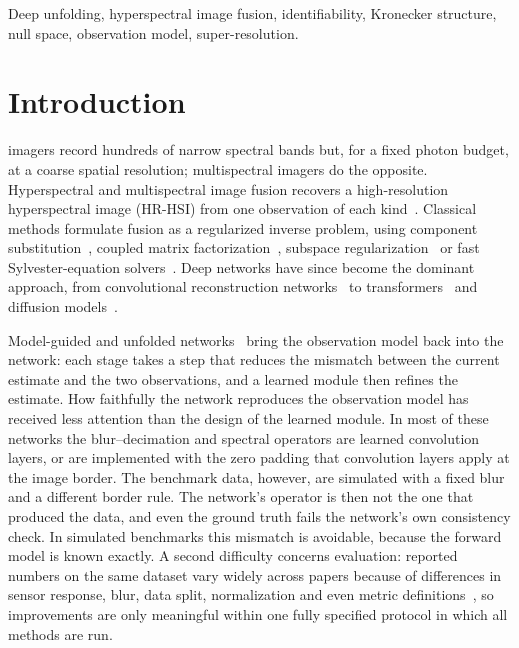 \documentclass[journal]{IEEEtran}
\begin{document}
\begin{IEEEkeywords}
Deep unfolding, hyperspectral image fusion, identifiability, Kronecker structure, null space, observation model, super-resolution.
\end{IEEEkeywords}

\section{Introduction}
 imagers record hundreds of narrow spectral bands but, for a fixed photon budget, at a coarse spatial resolution; multispectral imagers do the opposite. Hyperspectral and multispectral image fusion recovers a high-resolution hyperspectral image (HR-HSI) from one observation of each kind~\cite{yokoya2017review,loncan2015review,vivone2025deep}. Classical methods formulate fusion as a regularized inverse problem, using component substitution~\cite{aiazzi2007gsa}, coupled matrix factorization~\cite{yokoya2012cnmf}, subspace regularization~\cite{simoes2015hysure} or fast Sylvester-equation solvers~\cite{wei2015fuse}. Deep networks have since become the dominant approach, from convolutional reconstruction networks~\cite{zhang2021ssrnet,ran2023guidednet} to transformers~\cite{deng2023psrt,fang2024mimosst,he2024lgct,fu2025ssdt} and diffusion models~\cite{chen2026twostage,cao2024ddif,xu2026cdps,zhu2025argsdiff}.

Model-guided and unfolded networks~\cite{xie2022mhfnet,huang2022dhif,dong2021mogdcn,fang2024dunet,tian2024hmpnet,sun2025iatun} bring the observation model back into the network: each stage takes a step that reduces the mismatch between the current estimate and the two observations, and a learned module then refines the estimate. How faithfully the network reproduces the observation model has received less attention than the design of the learned module. In most of these networks the blur--decimation and spectral operators are learned convolution layers, or are implemented with the zero padding that convolution layers apply at the image border. The benchmark data, however, are simulated with a fixed blur and a different border rule. The network's operator is then not the one that produced the data, and even the ground truth fails the network's own consistency check. In simulated benchmarks this mismatch is avoidable, because the forward model is known exactly. A second difficulty concerns evaluation: reported numbers on the same dataset vary widely across papers because of differences in sensor response, blur, data split, normalization and even metric definitions~\cite{vivone2025deep}, so improvements are only meaningful within one fully specified protocol in which all methods are run.
\end{document}
